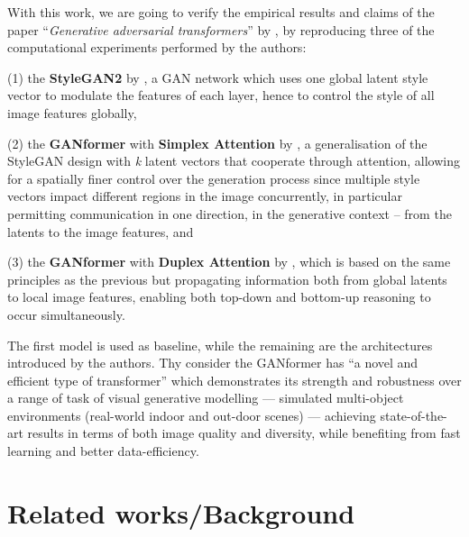 \documentclass{article}
\begin{document}
	With this work, we are going to verify the empirical results and claims of the paper 
	``\emph{Generative adversarial transformers}'' by \citet{hudson2021generative}, by reproducing 
	three of the computational experiments performed by the authors:
	\begin{enumerate*}
		\item[(1)] the \textbf{StyleGAN2} by \citet{karras2020analyzing,karras2019style}, a GAN 
		network which uses one 
		global latent style vector to modulate the features of each layer, hence to control the style of all 
		image features globally,
		\item[(2)] the \textbf{GANformer} with \textbf{Simplex Attention} by 
		\citet{hudson2021generative}, a generalisation of the StyleGAN design with \textit{k} latent 
		vectors that cooperate through attention, allowing for a spatially finer control over the generation 
		process since multiple style vectors impact different regions in the image concurrently, in 
		particular permitting communication in one direction, in the generative context – from the latents 
		to the image features, and
		\item[(3)] the \textbf{GANformer} with \textbf{Duplex Attention} by \citet{hudson2021generative}, 
		which is based on the same principles as the previous but propagating information both from 
		global latents to local image features, enabling both top-down and bottom-up reasoning to occur 
		simultaneously.
	\end{enumerate*} 
	
	The first model is used as baseline, while the remaining are the architectures introduced by the 
	authors. Thy consider the GANformer has ``a novel and efficient type of transformer'' which 
	demonstrates its strength and robustness over a range of task of visual generative modelling —  
	simulated multi-object environments (real-world indoor and out-door scenes) — achieving 
	state-of-the-art results in terms of both image quality and diversity, while benefiting from fast 
	learning and better data-efficiency. 
	

	\section{Related works/Background}	
	
\end{document}
